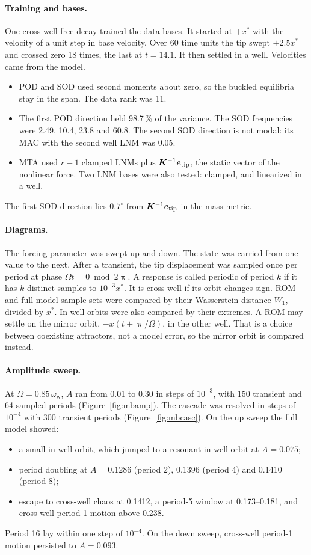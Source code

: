 \documentclass[preprint,12pt]{elsarticle}
\begin{document}
\paragraph{Training and bases.} One cross-well free decay trained the data bases. It started at $+x^*$ with the velocity of a unit step in base velocity. Over 60 time units the tip swept $\pm2.5x^*$ and crossed zero 18 times, the last at $t=14.1$. It then settled in a well. Velocities came from the model.
\begin{itemize}
\item POD and SOD used second moments about zero, so the buckled equilibria stay in the span. The data rank was 11.
\item The first POD direction held 98.7\,\% of the variance. The SOD frequencies were 2.49, 10.4, 23.8 and 60.8. The second SOD direction is not modal: its MAC with the second well LNM was 0.05.
\item MTA used $r-1$ clamped LNMs plus $\bm{K}^{-1}\bm{e}_{\mathrm{tip}}$, the static vector of the nonlinear force. Two LNM bases were also tested: clamped, and linearized in a well.
\end{itemize}
The first SOD direction lies $0.7^\circ$ from $\bm{K}^{-1}\bm{e}_{\mathrm{tip}}$ in the mass metric.

\paragraph{Diagrams.} The forcing parameter was swept up and down. The state was carried from one value to the next. After a transient, the tip displacement was sampled once per period at phase $\varOmega t=0 \bmod 2\uppi$. A response is called periodic of period $k$ if it has $k$ distinct samples to $10^{-3}x^*$. It is cross-well if its orbit changes sign. ROM and full-model sample sets were compared by their Wasserstein distance $W_1$, divided by $x^*$. In-well orbits were also compared by their extremes. A ROM may settle on the mirror orbit, $-x(t+\uppi/\varOmega)$, in the other well. That is a choice between coexisting attractors, not a model error, so the mirror orbit is compared instead.

\paragraph{Amplitude sweep.} At $\varOmega=0.85\,\omega_{\mathrm w}$, $A$ ran from 0.01 to 0.30 in steps of $10^{-3}$, with 150 transient and 64 sampled periods (Figure~\ref{fig:mbamp}). The cascade was resolved in steps of $10^{-4}$ with 300 transient periods (Figure~\ref{fig:mbcasc}). On the up sweep the full model showed:
\begin{itemize}
\item a small in-well orbit, which jumped to a resonant in-well orbit at $A=0.075$;
\item period doubling at $A=0.1286$ (period 2), 0.1396 (period 4) and 0.1410 (period 8);
\item escape to cross-well chaos at 0.1412, a period-5 window at 0.173--0.181, and cross-well period-1 motion above 0.238.
\end{itemize}
Period 16 lay within one step of $10^{-4}$. On the down sweep, cross-well period-1 motion persisted to $A=0.093$.
\end{document}
